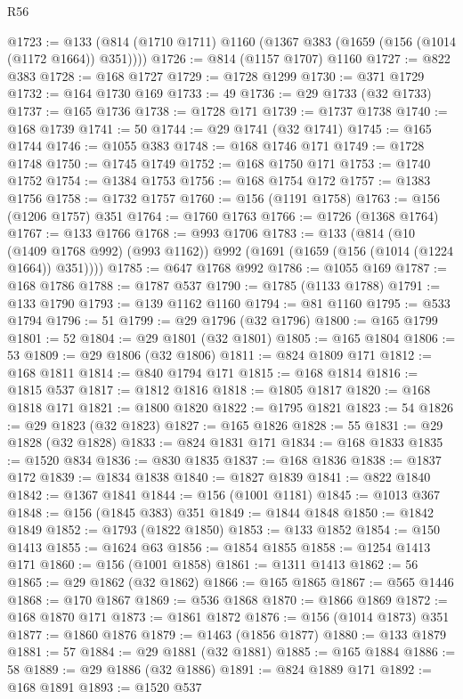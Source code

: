 \begin{lexlean}{R56}
\begin{coremodule}
@1723 := @133 (@814 (@1710 @1711) @1160 (@1367 @383 (@1659 (@156 (@1014 (@1172 @1664)) @351))))
@1726 := @814 (@1157 @1707) @1160
@1727 := @822 @383
@1728 := @168 @1727
@1729 := @1728 @1299
@1730 := @371 @1729
@1732 := @164 @1730 @169
@1733 := 49
@1736 := @29 @1733 (@32 @1733)
@1737 := @165 @1736
@1738 := @1728 @171
@1739 := @1737 @1738
@1740 := @168 @1739
@1741 := 50
@1744 := @29 @1741 (@32 @1741)
@1745 := @165 @1744
@1746 := @1055 @383
@1748 := @168 @1746 @171
@1749 := @1728 @1748
@1750 := @1745 @1749
@1752 := @168 @1750 @171
@1753 := @1740 @1752
@1754 := @1384 @1753
@1756 := @168 @1754 @172
@1757 := @1383 @1756
@1758 := @1732 @1757
@1760 := @156 (@1191 @1758)
@1763 := @156 (@1206 @1757) @351
@1764 := @1760 @1763
@1766 := @1726 (@1368 @1764)
@1767 := @133 @1766
@1768 := @993 @1706
@1783 := @133
    (@814
      (@10 (@1409 @1768 @992) (@993 @1162))
      @992
      (@1691 (@1659 (@156 (@1014 (@1224 @1664)) @351))))
@1785 := @647 @1768 @992
@1786 := @1055 @169
@1787 := @168 @1786
@1788 := @1787 @537
@1790 := @1785 (@1133 @1788)
@1791 := @133 @1790
@1793 := @139 @1162 @1160
@1794 := @81 @1160
@1795 := @533 @1794
@1796 := 51
@1799 := @29 @1796 (@32 @1796)
@1800 := @165 @1799
@1801 := 52
@1804 := @29 @1801 (@32 @1801)
@1805 := @165 @1804
@1806 := 53
@1809 := @29 @1806 (@32 @1806)
@1811 := @824 @1809 @171
@1812 := @168 @1811
@1814 := @840 @1794 @171
@1815 := @168 @1814
@1816 := @1815 @537
@1817 := @1812 @1816
@1818 := @1805 @1817
@1820 := @168 @1818 @171
@1821 := @1800 @1820
@1822 := @1795 @1821
@1823 := 54
@1826 := @29 @1823 (@32 @1823)
@1827 := @165 @1826
@1828 := 55
@1831 := @29 @1828 (@32 @1828)
@1833 := @824 @1831 @171
@1834 := @168 @1833
@1835 := @1520 @834
@1836 := @830 @1835
@1837 := @168 @1836
@1838 := @1837 @172
@1839 := @1834 @1838
@1840 := @1827 @1839
@1841 := @822 @1840
@1842 := @1367 @1841
@1844 := @156 (@1001 @1181)
@1845 := @1013 @367
@1848 := @156 (@1845 @383) @351
@1849 := @1844 @1848
@1850 := @1842 @1849
@1852 := @1793 (@1822 @1850)
@1853 := @133 @1852
@1854 := @150 @1413
@1855 := @1624 @63
@1856 := @1854 @1855
@1858 := @1254 @1413 @171
@1860 := @156 (@1001 @1858)
@1861 := @1311 @1413
@1862 := 56
@1865 := @29 @1862 (@32 @1862)
@1866 := @165 @1865
@1867 := @565 @1446
@1868 := @170 @1867
@1869 := @536 @1868
@1870 := @1866 @1869
@1872 := @168 @1870 @171
@1873 := @1861 @1872
@1876 := @156 (@1014 @1873) @351
@1877 := @1860 @1876
@1879 := @1463 (@1856 @1877)
@1880 := @133 @1879
@1881 := 57
@1884 := @29 @1881 (@32 @1881)
@1885 := @165 @1884
@1886 := 58
@1889 := @29 @1886 (@32 @1886)
@1891 := @824 @1889 @171
@1892 := @168 @1891
@1893 := @1520 @537

\end{coremodule}
\end{lexlean}
